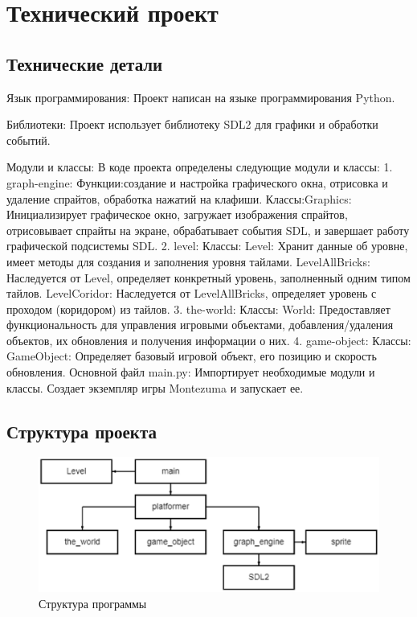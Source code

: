\section{Технический проект}
\subsection{Технические детали}
Язык программирования: Проект написан на языке программирования Python.

Библиотеки: Проект использует библиотеку SDL2 для графики и обработки событий.

Модули и классы: В коде проекта определены следующие модули и классы:
1. graph-engine:
Функции:создание и настройка графического окна, отрисовка и удаление спрайтов, обработка нажатий на клафиши.
Классы:Graphics: Инициализирует графическое окно, загружает изображения спрайтов, отрисовывает спрайты на экране, обрабатывает события SDL, и завершает работу графической подсистемы SDL.
2. level:
Классы:
Level: Хранит данные об уровне, имеет методы для создания и заполнения уровня тайлами.
LevelAllBricks: Наследуется от Level, определяет конкретный уровень, заполненный одним типом тайлов.
LevelCoridor: Наследуется от LevelAllBricks, определяет уровень с проходом (коридором) из тайлов.
3. the-world:
Классы:
World: Предоставляет функциональность для управления игровыми объектами, добавления/удаления объектов, их обновления и получения информации о них.
4. game-object:
Классы:
GameObject: Определяет базовый игровой объект, его позицию и скорость обновления.
Основной файл main.py:
Импортирует необходимые модули и классы.
Создает экземпляр игры Montezuma и запускает ее.

\subsection{Структура проекта}

\begin{figure}[H]
\centering
\includegraphics[width=1.05\linewidth]{images/dig1}
\caption{Структура программы}
\label{fig:dig1}
\end{figure}

